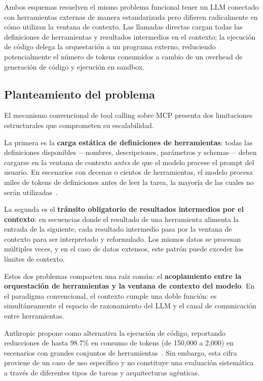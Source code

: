\documentclass[runningheads]{llncs}
\begin{document}
Ambos esquemas resuelven el mismo problema funcional tener un LLM conectado con herramientas externas de manera estandarizada pero difieren radicalmente en c\'omo utilizan la
ventana de contexto. Las llamadas directas cargan todas las definiciones de
herramientas y resultados intermedios en el contexto; la ejecuci\'on de c\'odigo
delega la orquestaci\'on a un programa externo, reduciendo potencialmente el
n\'umero de tokens consumidos a cambio de un overhead de generaci\'on de c\'odigo
y ejecuci\'on en sandbox.

\subsection{Planteamiento del problema}
\label{sec:problem}

El mecanismo convencional de tool calling sobre MCP presenta dos limitaciones
estructurales que comprometen su escalabilidad.

La primera es la \textbf{carga est\'atica de definiciones de herramientas}: todas
las definiciones disponibles ---nombres, descripciones, par\'ametros y schemas---
deben cargarse en la ventana de contexto \textit{antes} de que el modelo procese
el prompt del usuario. En escenarios con decenas o cientos de herramientas, el
modelo procesa miles de tokens de definiciones antes de leer la tarea, la
mayor\'ia de las cuales no ser\'an utilizadas~\cite{ref_codeexec}.

La segunda es el \textbf{tr\'ansito obligatorio de resultados intermedios por el
contexto}: en secuencias donde el resultado de una herramienta alimenta la
entrada de la siguiente, cada resultado intermedio pasa por la ventana de
contexto para ser interpretado y reformulado. Los mismos datos se procesan
m\'ultiples veces, y en el caso de datos extensos, este patr\'on puede exceder
los l\'imites de contexto.

Estos dos problemas comparten una ra\'iz com\'un: el \textbf{acoplamiento entre
la orquestaci\'on de herramientas y la ventana de contexto del modelo}. En el
paradigma convencional, el contexto cumple una doble funci\'on: es
simult\'aneamente el espacio de razonamiento del LLM y el canal de comunicaci\'on
entre herramientas.

Anthropic propone como alternativa la ejecuci\'on de c\'odigo, reportando
reducciones de hasta 98.7\% en consumo de tokens (de 150,000 a 2,000) en
escenarios con grandes conjuntos de herramientas~\cite{ref_codeexec}. Sin
embargo, esta cifra proviene de un caso de uso espec\'ifico y no constituye una
evaluaci\'on sistem\'atica a trav\'es de diferentes tipos de tareas y arquitecturas
ag\'enticas.
\end{document}
